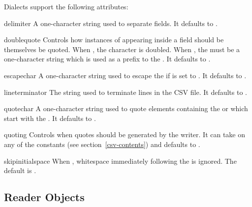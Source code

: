 Dialects support the following attributes:

\begin{memberdesc}[Dialect]{delimiter}
A one-character string used to separate fields.  It defaults to .
\end{memberdesc}

\begin{memberdesc}[Dialect]{doublequote}
Controls how instances of  appearing inside a field should be
themselves be quoted.  When , the character is doubled.
When , the  must be a one-character string
which is used as a prefix to the .  It defaults to
.
\end{memberdesc}

\begin{memberdesc}[Dialect]{escapechar}
A one-character string used to escape the  if 
is set to .  It defaults to .
\end{memberdesc}

\begin{memberdesc}[Dialect]{lineterminator}
The string used to terminate lines in the CSV file.  It defaults to
.
\end{memberdesc}

\begin{memberdesc}[Dialect]{quotechar}
A one-character string used to quote elements containing the 
or which start with the .  It defaults to .
\end{memberdesc}

\begin{memberdesc}[Dialect]{quoting}
Controls when quotes should be generated by the writer.  It can take on any
of the  constants (see section~\ref{csv-contents})
and defaults to . 
\end{memberdesc}

\begin{memberdesc}[Dialect]{skipinitialspace}
When , whitespace immediately following the 
is ignored.  The default is .
\end{memberdesc}


\subsection{Reader Objects}

